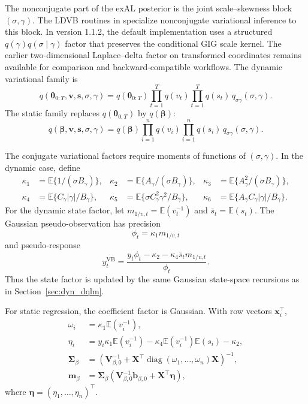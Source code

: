 \documentclass{jss}
\newcommand{\vect}[1]{\boldsymbol{#1}}
\newcommand{\mat}[1]{\mathbf{#1}}
\renewcommand{\E}{\mathbb{E}}
\newcommand{\diag}{\operatorname{diag}}
\begin{document}
The nonconjugate part of the exAL posterior is the joint scale--skewness
block $(\sigma,\gamma)$. The LDVB routines in  specialize
nonconjugate variational inference \citep{wang2013nonconjugatevb} to this
block. In version 1.1.2, the default implementation uses a structured
\(q(\gamma)q(\sigma\mid\gamma)\) factor that preserves the conditional GIG
scale kernel. The earlier two-dimensional Laplace--delta factor on transformed
coordinates remains available for comparison and backward-compatible
workflows.
The dynamic variational family is
\begin{equation}
q(\vect{\theta}_{0:T},\vect{v},\vect{s},\sigma,\gamma)
=q(\vect{\theta}_{0:T})\prod_{t=1}^Tq(v_t)\prod_{t=1}^Tq(s_t)\,
q_{\sigma\gamma}(\sigma,\gamma).
\label{eq:dyn_exdqlm_mf}
\end{equation}
The static family replaces $q(\vect{\theta}_{0:T})$ by
$q(\vect{\beta})$:
\begin{equation}
q(\vect{\beta},\vect{v},\vect{s},\sigma,\gamma)
=q(\vect{\beta})\prod_{i=1}^nq(v_i)\prod_{i=1}^nq(s_i)\,
q_{\sigma\gamma}(\sigma,\gamma).
\label{eq:static_exal_mf}
\end{equation}

The conjugate variational factors require moments of functions of
$(\sigma,\gamma)$. In the dynamic case, define
\begin{align}
\kappa_1 &= \E\{1/(\sigma B_\gamma)\},&
\kappa_2 &= \E\{A_\gamma/(\sigma B_\gamma)\},&
\kappa_3 &= \E\{A_\gamma^2/(\sigma B_\gamma)\},\\
\kappa_4 &= \E\{C_\gamma|\gamma|/B_\gamma\},&
\kappa_5 &= \E\{\sigma C_\gamma^2\gamma^2/B_\gamma\},&
\kappa_6 &= \E\{A_\gamma C_\gamma|\gamma|/B_\gamma\}.
\label{eq:dyn_exdqlm_kappa}
\end{align}
For the dynamic state factor, let $m_{1/v,t}=\E(v_t^{-1})$ and
$\bar s_t=\E(s_t)$. The Gaussian pseudo-observation has precision
\begin{equation}
\phi_t=\kappa_1m_{1/v,t}
\label{eq:dyn_exdqlm_vb_precision}
\end{equation}
and pseudo-response
\begin{equation}
y_t^{\mathrm{VB}}
=
\frac{
y_t\phi_t-\kappa_2-\kappa_4\bar s_t m_{1/v,t}
}{\phi_t}.
\label{eq:dyn_exdqlm_vb_pseudo}
\end{equation}
Thus the state factor is updated by the same Gaussian state-space recursions
as in Section~\ref{sec:dyn_dqlm}.

For static regression, the coefficient factor is Gaussian. With row vectors
$\vect{x}_i^\top$,
\begin{align}
\omega_i&=\kappa_1\E(v_i^{-1}),\\
\eta_i&=
y_i\kappa_1\E(v_i^{-1})
-\kappa_4\E(v_i^{-1})\E(s_i)
-\kappa_2,\\
\mat{\Sigma}_\beta
&=\left(\mat{V}_{\beta,0}^{-1}
+\mat{X}^\top\diag(\omega_1,\ldots,\omega_n)\mat{X}\right)^{-1},\\
\vect{m}_\beta
&=\mat{\Sigma}_\beta
\left(\mat{V}_{\beta,0}^{-1}\vect{b}_{\beta,0}
+\mat{X}^\top\vect{\eta}\right),
\label{eq:static_exal_vb_beta}
\end{align}
where $\vect{\eta}=(\eta_1,\ldots,\eta_n)^\top$.
\end{document}
